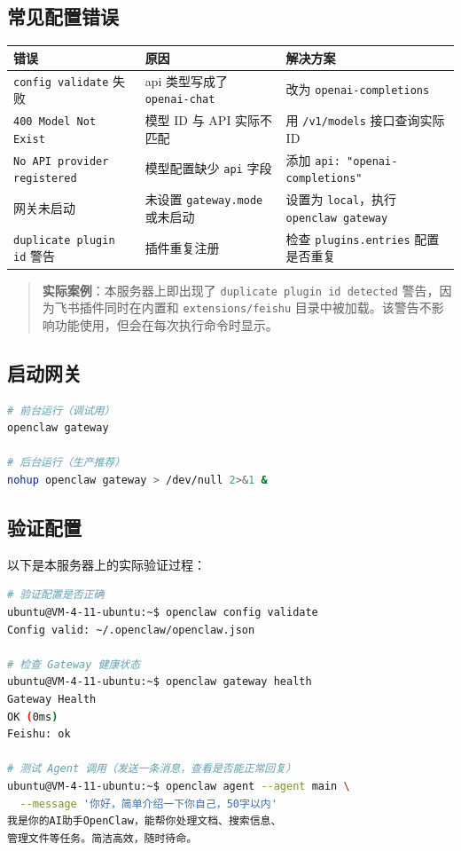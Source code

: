 \subsection{常见配置错误}


\begin{table}[h]
\centering
\small
\begin{tabular}{|l|l|l|}
\hline
错误 & 原因 & 解决方案 \\
\hline
\texttt{config validate} 失败 & api 类型写成了 \texttt{openai-chat} & 改为 \texttt{openai-completions} \\
\hline
\texttt{400 Model Not Exist} & 模型 ID 与 API 实际不匹配 & 用 \texttt{/v1/models} 接口查询实际 ID \\
\hline
\texttt{No API provider registered} & 模型配置缺少 \texttt{api} 字段 & 添加 \texttt{api: "openai-completions"} \\
\hline
网关未启动 & 未设置 \texttt{gateway.mode} 或未启动 & 设置为 \texttt{local}，执行 \texttt{openclaw gateway} \\
\hline
\texttt{duplicate plugin id} 警告 & 插件重复注册 & 检查 \texttt{plugins.entries} 配置是否重复 \\
\hline
\end{tabular}
\end{table}

\begin{quote}
\textbf{实际案例}：本服务器上即出现了 \texttt{duplicate plugin id detected} 警告，因为飞书插件同时在内置和 \texttt{extensions/feishu} 目录中被加载。该警告不影响功能使用，但会在每次执行命令时显示。
\end{quote}

\subsection{启动网关}


\begin{lstlisting}[language=bash]
# 前台运行（调试用）
openclaw gateway

# 后台运行（生产推荐）
nohup openclaw gateway > /dev/null 2>&1 &
\end{lstlisting}

\subsection{验证配置}


以下是本服务器上的实际验证过程：

\begin{lstlisting}[language=bash]
# 验证配置是否正确
ubuntu@VM-4-11-ubuntu:~$ openclaw config validate
Config valid: ~/.openclaw/openclaw.json

# 检查 Gateway 健康状态
ubuntu@VM-4-11-ubuntu:~$ openclaw gateway health
Gateway Health
OK (0ms)
Feishu: ok

# 测试 Agent 调用（发送一条消息，查看是否能正常回复）
ubuntu@VM-4-11-ubuntu:~$ openclaw agent --agent main \
  --message '你好，简单介绍一下你自己，50字以内'
我是你的AI助手OpenClaw，能帮你处理文档、搜索信息、
管理文件等任务。简洁高效，随时待命。
\end{lstlisting}

